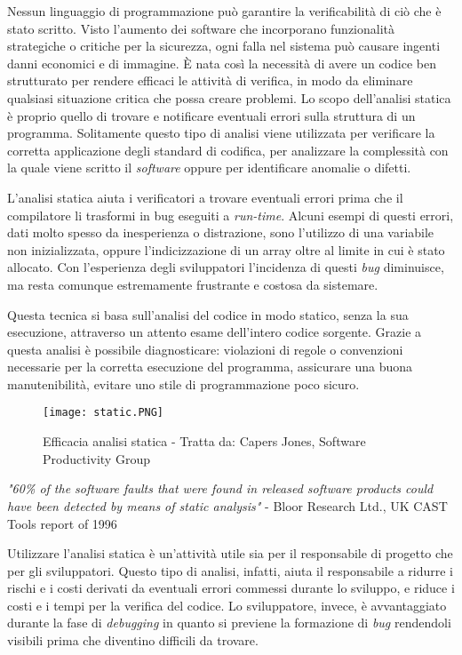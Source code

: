 Nessun linguaggio di programmazione può garantire la verificabilità di ciò che è stato scritto. Visto l'aumento dei software che incorporano funzionalità strategiche o critiche per la sicurezza, ogni falla nel sistema può causare ingenti danni economici e di immagine. È nata così la necessità di avere un codice ben strutturato per rendere efficaci le attività di verifica, in modo da eliminare qualsiasi situazione critica che possa creare problemi. Lo scopo dell'analisi statica è proprio quello di trovare e notificare eventuali errori sulla struttura di un programma. Solitamente questo tipo di analisi viene utilizzata per verificare la corretta applicazione degli standard di codifica, per analizzare la complessità con la quale viene scritto il \textit{software} oppure per identificare anomalie o difetti.

L'analisi statica aiuta i verificatori a trovare eventuali errori prima che il compilatore li trasformi in bug eseguiti a \textit{run-time}. Alcuni esempi di questi errori, dati molto spesso da inesperienza o distrazione, sono l'utilizzo di una variabile non inizializzata, oppure l'indicizzazione di un array oltre al limite in cui è stato allocato. Con l'esperienza degli sviluppatori l'incidenza di questi \textit{bug} diminuisce, ma resta comunque estremamente frustrante e costosa da sistemare.

Questa tecnica si basa sull'analisi del codice in modo statico, senza la sua esecuzione, attraverso un attento esame dell'intero codice sorgente. Grazie a questa analisi è possibile diagnosticare: violazioni di regole o convenzioni necessarie per la corretta esecuzione del programma, assicurare una buona manutenibilità, evitare uno stile di programmazione poco sicuro.

\begin{figure}[H]
  \centering
  \texttt{[image: static.PNG]}
  \caption{Efficacia analisi statica - Tratta da: Capers Jones, Software Productivity Group}
\end{figure}

\textit{"60\% of the software faults that were found in released software products could have been detected by means of static analysis"} - Bloor Research Ltd., UK CAST Tools report of 1996

Utilizzare l'analisi statica è un'attività utile sia per il responsabile di progetto che per gli sviluppatori. Questo tipo di analisi, infatti, aiuta il responsabile a ridurre i rischi e i costi derivati da eventuali errori commessi durante lo sviluppo, e riduce i costi e i tempi per la verifica del codice. Lo sviluppatore, invece, è avvantaggiato durante la fase di \textit{debugging} in quanto si previene la formazione di \textit{bug} rendendoli visibili prima che diventino difficili da trovare.

